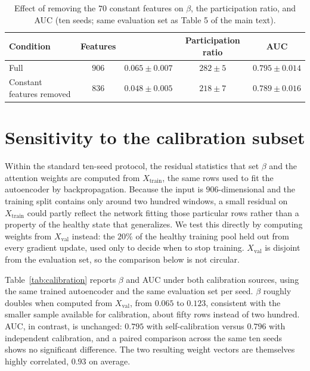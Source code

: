 \documentclass[11pt,a4paper]{article}
\begin{document}
\begin{table}[htbp]
\centering
\caption{Effect of removing the $70$ constant features on $\beta$, the
participation ratio, and AUC (ten seeds; same evaluation set as Table 5 of
the main text).}
\label{tab:constant}
\small
\begin{tabular}{@{}lcccc@{}}
\toprule
\textbf{Condition} & \textbf{Features} & \boldmath{$\beta$} & \textbf{Participation ratio} & \textbf{AUC} \\
\midrule
Full                          & $906$ & $0.065 \pm 0.007$ & $282 \pm 5$ & $0.795 \pm 0.014$ \\
Constant features removed     & $836$ & $0.048 \pm 0.005$ & $218 \pm 7$ & $0.789 \pm 0.016$ \\
\bottomrule
\end{tabular}
\end{table}

\section{Sensitivity to the calibration subset}
\label{sec:calibration}

Within the standard ten-seed protocol, the residual statistics that set
$\beta$ and the attention weights are computed from $X_{\text{train}}$, the
same rows used to fit the autoencoder by backpropagation. Because the input
is $906$-dimensional and the training split contains only around two hundred
windows, a small residual on $X_{\text{train}}$ could partly reflect the
network fitting those particular rows rather than a property of the healthy
state that generalizes. We test this directly by computing weights from
$X_{\text{val}}$ instead: the $20\%$ of the healthy training pool held out
from every gradient update, used only to decide when to stop training.
$X_{\text{val}}$ is disjoint from the evaluation set, so the comparison below
is not circular.

Table~\ref{tab:calibration} reports $\beta$ and AUC under both calibration
sources, using the same trained autoencoder and the same evaluation set per
seed. $\beta$ roughly doubles when computed from $X_{\text{val}}$, from
$0.065$ to $0.123$, consistent with the smaller sample available for
calibration, about fifty rows instead of two hundred. AUC, in contrast, is
unchanged: $0.795$ with self-calibration versus $0.796$ with independent
calibration, and a paired comparison across the same ten seeds shows no
significant difference. The two resulting weight vectors are themselves
highly correlated, $0.93$ on average.
\end{document}

